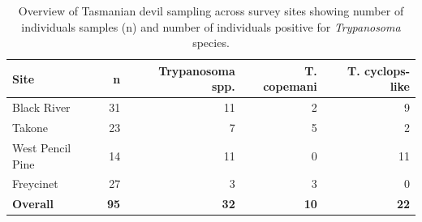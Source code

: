 \documentclass[a4paper, nobind]{templates/ociamthesis}
\begin{document}
\begin{table}

\caption[Trypanosome prevalence in Tasmanian devils.]{\label{tab:T62}Overview of Tasmanian devil sampling across survey sites showing number of individuals samples (n) and number of individuals positive for \textit{Trypanosoma} species.}
\centering
\fontsize{8.5}{10.5}\selectfont
\begin{tabular}[t]{lrrrr}
\toprule
Site & n & Trypanosoma spp. & T. copemani & T. cyclops-like\\
\midrule
Black River & 31 & 11 & 2 & 9\\
Takone & 23 & 7 & 5 & 2\\
West Pencil Pine & 14 & 11 & 0 & 11\\
Freycinet & 27 & 3 & 3 & 0\\
\textbf{Overall} & \textbf{95} & \textbf{32} & \textbf{10} & \textbf{22}\\
\bottomrule
\end{tabular}
\end{table}
\end{document}
